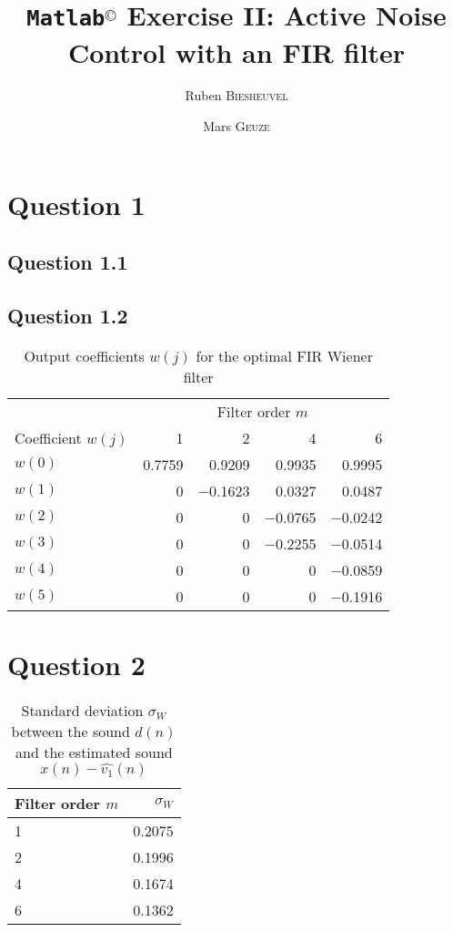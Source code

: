 \documentclass[12pt,a4paper]{article}
\title{\textbf{\texttt{Matlab}$^\text{{\fontsize{12}{1em}\textcopyright}}$ Exercise II: Active Noise Control with an FIR filter}}
\author[$\dagger$]{Ruben \textsc{Biesheuvel}}
\author[$\ddagger$]{Mars \textsc{Geuze}}
\affil[$\dagger$]{Student number 4076680}
\affil[$\ddagger$]{Student number 4109139}
\begin{document}
	\maketitle

\section*{Question 1}
\subsection*{Question 1.1}
\subsection*{Question 1.2}
\label{code1}

\begin{table}[h!]
\centering
\caption{Output coefficients $w(j)$ for the optimal FIR Wiener filter}
\begin{tabular}{l r r r r}
\hline
 & \multicolumn{4}{c}{Filter order $m$}\\
 \cline{2-5}
Coefficient $w(j)$ & \num{1} & \num{2} & \num{4} & \num{6} \\
\hline
$w(0)$ & \num{0.7759} & \num{0.9209}& \num{0.9935} & \num{0.9995} \\
$w(1)$ & \num{0} & \num{-0.1623}& \num{0.0327}& \num{0.0487} \\
$w(2)$ & \num{0}& \num{0}& \num{-0.0765}& \num{-0.0242}\\
$w(3)$ & \num{0}& \num{0}& \num{-0.2255}& \num{-0.0514}\\
$w(4)$ & \num{0}& \num{0}& \num{0}& \num{-0.0859}\\
$w(5)$ & \num{0}& \num{0}& \num{0}& \num{-0.1916}\\
\hline
\end{tabular}
\end{table}

\clearpage\section*{Question 2}

\begin{table}[h!]
\centering
\caption{Standard deviation $\sigma_{W}$ between the sound $d(n)$ and the estimated sound $x(n) - \hat{v_{1}}(n)$}
\begin{tabular}{l | r}
Filter order $m$ & $\sigma_{W}$ \\
\hline
\num{1} & \num{0.2075}\\
\num{2} & \num{0.1996}\\
\num{4} & \num{0.1674}\\
\num{6} & \num{0.1362}\\
\hline
\end{tabular}
\end{table}
\end{document}
